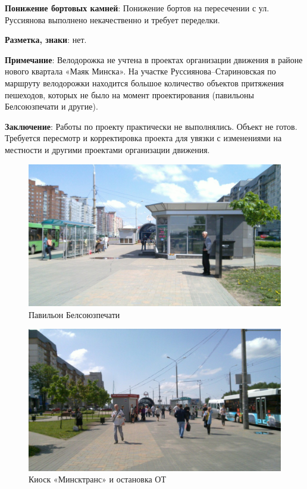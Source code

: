 \documentclass[a4paper,14pt,twoside]{extarticle}
\renewcommand\emph[1]{\textbf{#1}}
\begin{document}
\emph{Понижение бортовых камней}: Понижение бортов на пересечении с ул. Руссиянова выполнено некачественно и требует переделки.

\emph{Разметка, знаки}: нет.

\emph{Примечание}: Велодорожка не учтена в проектах организации движения в районе нового квартала «Маяк Минска». На участке Руссиянова–Стариновская по маршруту велодорожки находится большое количество объектов притяжения пешеходов, которых не было на момент проектирования (павильоны Белсоюзпечати и другие).

\emph{Заключение}: Работы по проекту практически не выполнялись. Объект не готов. Требуется пересмотр и корректировка проекта для увязки с изменениями на местности и другими проектами организации движения.

\begin{figure}[h!]
    \centering
    \includegraphics[width=\textwidth]{Pictures/1000000000000A00000005A0A7383363.jpg}
    \caption{Павильон Белсоюзпечати}
\end{figure}

\begin{figure}[h!]
    \centering
    \includegraphics[width=\textwidth]{Pictures/1000000000000A00000005A0C142740A.jpg}
    \caption{Киоск «Минсктранс» и остановка ОТ}
\end{figure}
\end{document}

